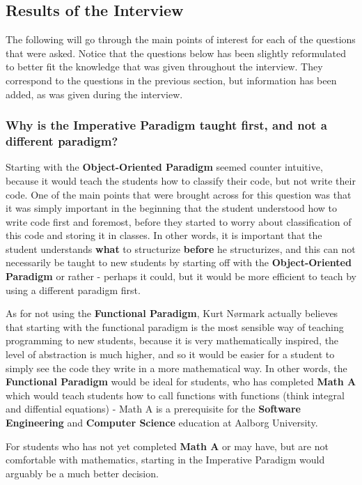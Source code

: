 \subsection{Results of the Interview}

The following will go through the main points of interest for each of the questions that were asked. Notice that the questions below has been slightly reformulated to better fit the knowledge that was given throughout the interview. They correspond to the questions in the previous section, but information has been added, as was given during the interview.

\subsubsection{Why is the Imperative Paradigm taught first, and not a different paradigm?}

Starting with the \textbf{Object-Oriented Paradigm} seemed counter intuitive, because it would teach the students how to classify their code, but not write their code. One of the main points that were brought across for this question was that it was simply important in the beginning that the student understood how to write code first and foremost, before they started to worry about classification of this code and storing it in classes. In other words, it is important that the student understands \textbf{what} to structurize \textbf{before} he structurizes, and this can not necessarily be taught to new students by starting off with the \textbf{Object-Oriented Paradigm} or rather - perhaps it could, but it would be more efficient to teach by using 
a different paradigm first. 


As for not using the \textbf{Functional Paradigm}, Kurt N{\o}rmark actually believes that starting with the functional paradigm is the most sensible way of teaching programming to new students, because it is very mathematically inspired, the level of abstraction is much higher, and so it would be easier for a student to simply see the code they write in a more mathematical way. In other words, the \textbf{Functional Paradigm} would be ideal for students, who has completed \textbf{Math A} which would teach students how to call functions with functions (think integral and diffential equations) - Math A is a prerequisite for the \textbf{Software Engineering} and \textbf{Computer Science} education at Aalborg University.


For students who has not yet completed \textbf{Math A} or may have, but are not comfortable with mathematics, starting in the Imperative Paradigm would 
arguably be a much better decision.


